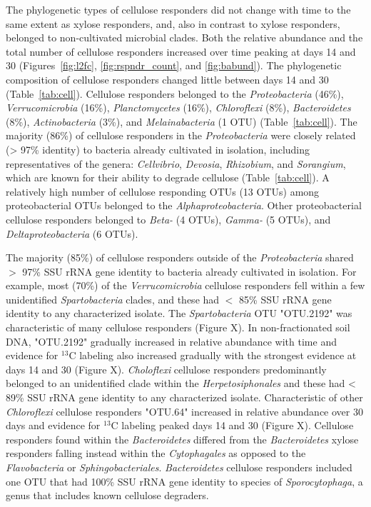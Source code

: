 The phylogenetic types of cellulose responders did not change with time to the
same extent as xylose responders, and, also in contrast to xylose responders,
belonged to non-cultivated microbial clades. Both the relative abundance and
the total number of cellulose responders increased over time peaking at days 14
and 30 (Figures~\ref{fig:l2fc}, \ref{fig:rspndr_count}, and \ref{fig:babund}). The phylogenetic composition of cellulose
responders changed little between days 14 and 30 (Table~\ref{tab:cell}). Cellulose
responders belonged to the \textit{Proteobacteria} (46\%),
\textit{Verrucomicrobia} (16\%), \textit{Planctomycetes} (16\%),
\textit{Chloroflexi} (8\%), \textit{Bacteroidetes} (8\%),
\textit{Actinobacteria} (3\%), and \textit{Melainabacteria} (1 OTU) (Table~\ref{tab:cell}).
The majority (86\%) of cellulose responders in the \textit{Proteobacteria} were
closely related (> 97\% identity) to bacteria already cultivated in isolation,
including representatives of the genera: \textit{Cellvibrio}, \textit{Devosia},
\textit{Rhizobium}, and \textit{Sorangium}, which are known for their ability
to degrade cellulose (Table~\ref{tab:cell}). A relatively high number of cellulose
responding OTUs (13 OTUs) among proteobacterial OTUs belonged to the
\textit{Alphaproteobacteria}. Other proteobacterial cellulose responders
belonged to \textit{Beta-} (4 OTUs), \textit{Gamma-} (5 OTUs), and
\textit{Deltaproteobacteria} (6 OTUs). 

The majority (85\%) of cellulose responders outside of the
\textit{Proteobacteria} shared  $>$ 97\% SSU rRNA gene identity to bacteria
already cultivated in isolation. For example, most (70\%) of the
\textit{Verrucomicrobia} cellulose responders fell within a few unidentified
\textit{Spartobacteria} clades, and these had $<$ 85\% SSU rRNA gene identity
to any characterized isolate. The \textit{Spartobacteria} OTU "OTU.2192" was
characteristic of many cellulose responders (Figure X). In non-fractionated
soil DNA, "OTU.2192" gradually increased in relative abundance with time and
evidence for $^{13}$C labeling also increased gradually with the strongest evidence
at days 14 and 30 (Figure X). \textit{Choloflexi} cellulose responders
predominantly belonged to an unidentified clade within the
\textit{Herpetosiphonales} and these had < 89\% SSU rRNA gene identity to any
characterized isolate. Characteristic of other \textit{Chloroflexi} cellulose
responders "OTU.64" increased in relative abundance over 30 days and evidence
for $^{13}$C labeling peaked days 14 and 30 (Figure X). Cellulose responders found
within the \textit{Bacteroidetes} differed from the \textit{Bacteroidetes}
xylose responders falling instead within the \textit{Cytophagales} as opposed
to the \textit{Flavobacteria} or \textit{Sphingobacteriales}.
\textit{Bacteroidetes} cellulose responders included one OTU that had 100\% SSU
rRNA gene identity to species of \textit{Sporocytophaga}, a genus that includes
known cellulose degraders.

